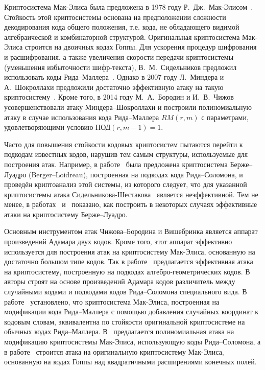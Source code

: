 Криптосистема Мак-Элиса была предложена в 1978 году Р.~Дж.~Мак-Элисом~\cite{mceliece1978public}.
Стойкость этой криптосистемы основана на предположении сложности декодирования кода общего положения, т.е. кода, не обладающего видимой алгебраической и комбинаторной структурой.
Оригинальная криптосистема Мак-Элиса строится на двоичных кодах Гоппы.
Для ускорения процедур шифрования и расшифрования, а также увеличения скорости передачи криптосистемы (уменьшения избыточности шифр-текста), В.~М.~Сидельников предложил использовать коды Рида--Маллера~\cite{sidelnikov1994open}.
Однако в 2007 году Л.~Миндера и А.~Шокроллахи предложили достаточно эффективную атаку на такую криптосистему~\cite{minder2007cryptanalysis}.
Кроме того, в 2014 году М.~А.~Бородин и И.~В.~Чижов~\cite{borodin2014effective} усовершенствовали атаку Миндера--Шокроллахи и построили полиномиальную атаку в случае использования кода Рида--Маллера \(RM(r,m)\)  с параметрами, удовлетворяющими условию НОД\((r,m-1)=1\).

Часто для повышения стойкости кодовых криптосистем пытаются перейти к подкодам известных кодов, нарушив тем самым структуры, используемые для построения атак.
Например, в работе~\cite{berger2005how} была предложена криптосистема Берже--Луадро (Berger--Loidreau), построенная на подкодах кода Рида--Соломона, и проведён криптоанализ этой системы, из которого следует, что для указанной криптосистемы атака Сидельникова-Шестакова~\cite{sidelnikov1992about} является неэффективной.
Тем не менее, в работах~\cite{wieschebrink2006attack} и~\cite{wieschebrink2010cryptanalysis} показано, как построить в некоторых случаях эффективные атаки на криптосистему Берже--Луадро.

Основным инструментом атак Чижова--Бородина и Вишебринка является аппарат произведений Адамара двух кодов.
Кроме того, этот аппарат эффективно используется для построения атак на криптосистему Мак-Элиса, основанную на достаточно большом типе кодов.
Так в работе~\cite{couvreur2015cryptanalysis} предлагается эффективная атака на криптосистему, построенную на подкодах алгебро-геометрических кодов.
В~\cite{couvreur2014distinguisher} авторы строят на основе произведений Адамара кодов различитель между случайными кодами и подкодами кодов Рида--Соломона специального вида.
В работе~\cite{otmani2015square} установлено, что криптосистема Мак-Элиса, построенная на модификации кода Рида--Маллера с помощью добавления случайных координат к кодовым словам, эквивалентна по стойкости оригинальной криптосистеме на обычных кодах Рида--Маллера.
В~\cite{couvreur2015polynomial} предлагается полиномиальная атака на модификацию криптосистемы Мак-Элиса, использующую коды Рида--Соломона, а в работе~\cite{couvreur2017polynomial} строится атака на оригинальную криптосистему Мак-Элиса, основанную на кодах Гоппы над квадратичными расширениями конечных полей.

